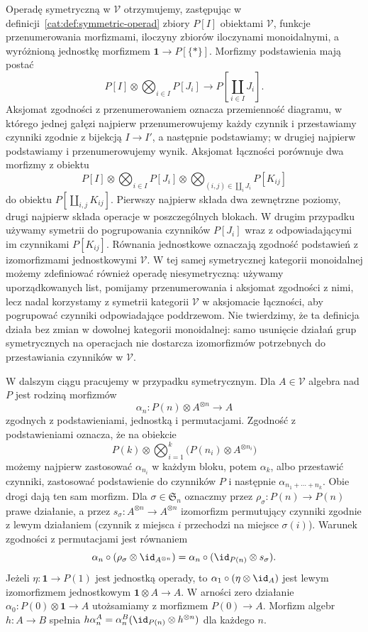 \begin{definicja}\label{cat:def:monoidal-operad}
Operadę symetryczną w $\mathcal V$ otrzymujemy, zastępując w definicji~\ref{cat:def:symmetric-operad} zbiory $P[I]$ obiektami $\mathcal V$, funkcje przenumerowania morfizmami, iloczyny zbiorów iloczynami monoidalnymi, a wyróżnioną jednostkę morfizmem $\mathbf 1\to P[\{*\}]$. Morfizmy podstawienia mają postać
\[
 P[I]\otimes\bigotimes_{i\in I}P[J_i]
 \longrightarrow P\left[\coprod_{i\in I}J_i\right].
\]
Aksjomat zgodności z przenumerowaniem oznacza przemienność diagramu, w którego jednej gałęzi najpierw przenumerowujemy każdy czynnik i przestawiamy czynniki zgodnie z bijekcją $I\to I'$, a następnie podstawiamy; w drugiej najpierw podstawiamy i przenumerowujemy wynik. Aksjomat łączności porównuje dwa morfizmy z obiektu
\[
 P[I]\otimes\bigotimes_{i\in I}P[J_i]\otimes
 \bigotimes_{(i,j)\in\coprod_iJ_i}P[K_{ij}]
\]
do obiektu $P[\coprod_{i,j}K_{ij}]$. Pierwszy najpierw składa dwa zewnętrzne poziomy, drugi najpierw składa operacje w poszczególnych blokach. W drugim przypadku używamy symetrii do pogrupowania czynników $P[J_i]$ wraz z odpowiadającymi im czynnikami $P[K_{ij}]$. Równania jednostkowe oznaczają zgodność podstawień z izomorfizmami jednostkowymi $\mathcal V$. W tej samej symetrycznej kategorii monoidalnej możemy zdefiniować również operadę niesymetryczną: używamy uporządkowanych list, pomijamy przenumerowania i aksjomat zgodności z nimi, lecz nadal korzystamy z symetrii kategorii $\mathcal V$ w aksjomacie łączności, aby pogrupować czynniki odpowiadające poddrzewom. Nie twierdzimy, że ta definicja działa bez zmian w dowolnej kategorii monoidalnej: samo usunięcie działań grup symetrycznych na operacjach nie dostarcza izomorfizmów potrzebnych do przestawiania czynników w $\mathcal V$.
\end{definicja}

W dalszym ciągu pracujemy w przypadku symetrycznym. Dla $A\in\mathcal V$ algebra nad $P$ jest rodziną morfizmów
\[
 \alpha_n:P(n)\otimes A^{\otimes n}\longrightarrow A
\]
zgodnych z podstawieniami, jednostką i permutacjami. Zgodność z podstawieniami oznacza, że na obiekcie
\[
 P(k)\otimes\bigotimes_{i=1}^{k}
       \bigl(P(n_i)\otimes A^{\otimes n_i}\bigr)
\]
możemy najpierw zastosować $\alpha_{n_i}$ w każdym bloku, potem $\alpha_k$, albo przestawić czynniki, zastosować podstawienie do czynników $P$ i następnie $\alpha_{n_1+\cdots+n_k}$. Obie drogi dają ten sam morfizm. Dla $\sigma\in\mathfrak S_n$ oznaczmy przez $\rho_\sigma:P(n)\to P(n)$ prawe działanie, a przez $s_\sigma:A^{\otimes n}\to A^{\otimes n}$ izomorfizm permutujący czynniki zgodnie z lewym działaniem (czynnik z miejsca $i$ przechodzi na miejsce $\sigma(i)$). Warunek zgodności z permutacjami jest równaniem
\[
 \alpha_n\circ(\rho_\sigma\otimes\id_{A^{\otimes n}})
 =\alpha_n\circ(\id_{P(n)}\otimes s_\sigma).
\]
Jeżeli $\eta:\mathbf 1\to P(1)$ jest jednostką operady, to $\alpha_1\circ(\eta\otimes\id_A)$ jest lewym izomorfizmem jednostkowym $\mathbf 1\otimes A\to A$. W arności zero działanie $\alpha_0:P(0)\otimes\mathbf 1\to A$ utożsamiamy z morfizmem $P(0)\to A$. Morfizm algebr $h:A\to B$ spełnia $h\alpha_n^A=\alpha_n^B(\id_{P(n)}\otimes h^{\otimes n})$ dla każdego $n$.

